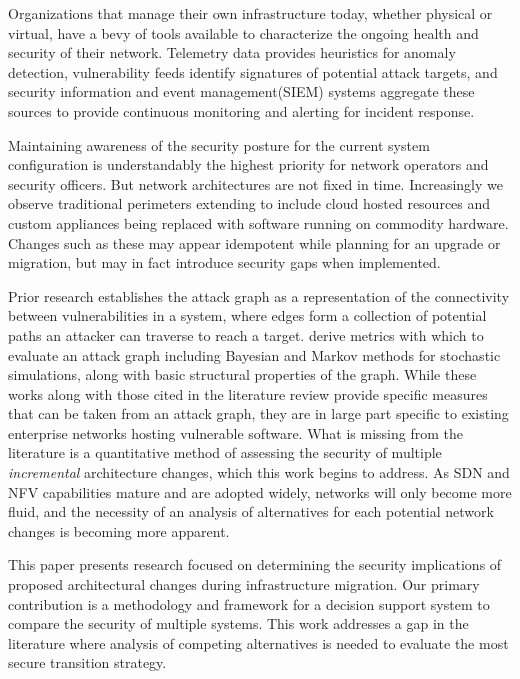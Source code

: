 
Organizations that manage their own infrastructure today, whether physical or virtual, have a bevy of tools available to characterize the ongoing health and security of their network. Telemetry data provides heuristics for anomaly detection, vulnerability feeds identify signatures of potential attack targets, and security information and event management(SIEM) systems aggregate these sources to provide continuous monitoring and alerting for incident response. 

Maintaining awareness of the security posture for the current system configuration is understandably the highest priority for network operators and security officers. But network architectures are not fixed in time. Increasingly we observe traditional perimeters extending to include cloud hosted resources and custom appliances being replaced with software running on commodity hardware. Changes such as these may appear idempotent while planning for an upgrade or migration, but may in fact introduce security gaps when implemented. 

Prior research establishes the attack graph \cite{ Dacier_1994, Lippmann_Ingols_2005, Ou_Govindavajhala_Appel, Phillips_Swiler_1998, Sheyner_Haines_Jha_Lippmann_Wing_2002} as a representation of the connectivity between vulnerabilities in a system, where edges form a collection of potential paths an attacker can traverse to reach a target. \cite{Abraham_Nair_2015c, Idika_Bhargava_2012, Noel_Jajodia_2014} derive metrics with which to evaluate an attack graph including Bayesian and Markov methods for stochastic simulations, along with basic structural properties of the graph. While these works along with those cited in the literature review provide specific measures that can be taken from an attack graph, they are in large part specific to existing enterprise networks hosting vulnerable software. What is missing from the literature is a quantitative method of assessing the security of multiple \textit{incremental} architecture changes, which this work begins to address. As SDN and NFV capabilities mature and are adopted widely, networks will only become more fluid, and the necessity of an analysis of alternatives for each potential network changes is becoming more apparent. 

This paper presents research focused on determining the security implications of proposed architectural changes during infrastructure migration. Our primary contribution is a methodology and framework for a decision support system to compare the security of multiple systems. This work addresses a gap in the literature where analysis of competing alternatives is needed to evaluate the most secure transition strategy. 

